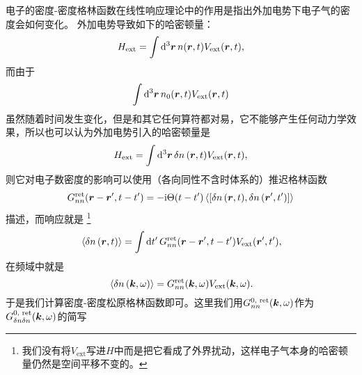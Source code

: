 电子的密度-密度格林函数在线性响应理论中的作用是指出外加电势下电子气的密度会如何变化。
外加电势导致如下的哈密顿量：
\[
    {H}_\text{ext} = \int \dd[3]{\vb*{r}} {n}(\vb*{r}, t) V_\text{ext} (\vb*{r}, t),
\]
而由于
\[
    \int \dd[3]{\vb*{r}} n_0(\vb*{r}, t) V_\text{ext}(\vb*{r}, t)
\]
虽然随着时间发生变化，但是和其它任何算符都对易，它不能够产生任何动力学效果，所以也可以认为外加电势引入的哈密顿量是
\[
    {H}_\text{ext} = \int \dd[3]{\vb*{r}} \var{n}(\vb*{r}, t) V_\text{ext} (\vb*{r}, t),
\]
则它对电子数密度的影响可以使用（各向同性不含时体系的）推迟格林函数
\[
    G^\text{ret}_{nn}(\vb*{r}-\vb*{r}', t-t') = - \ii \Theta(t-t') \expval*{\comm{\var{{n}}(\vb*{r}, t)}{\var{{n}}(\vb*{r}', t')}}
\]
描述，而响应就是%
\footnote{我们没有将$V_\text{ext}$写进${H}$中而是把它看成了外界扰动，这样电子气本身的哈密顿量仍然是空间平移不变的。}%
\begin{equation}
    \expval*{\var{{n}}(\vb*{r}, t)} = \int \dd{t'} G^\text{ret}_{nn}(\vb*{r}-\vb*{r}', t-t') V_\text{ext}(\vb*{r}', t'),
\end{equation}
在频域中就是
\begin{equation}
    \expval*{\var{{n}}(\vb*{k}, \omega)} = G^\text{ret}_{nn}(\vb*{k}, \omega) V_\text{ext}(\vb*{k}, \omega).
    \label{eq:green-function-electro-shielding}
\end{equation}
于是我们计算密度-密度松原格林函数即可。这里我们用$G^\text{0, ret}_{nn} (\vb*{k}, \omega)$作为$G^\text{0, ret}_{\var{n}\var{n}} (\vb*{k}, \omega)$的简写

